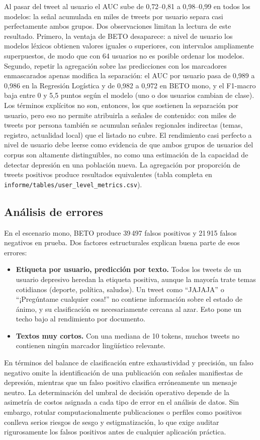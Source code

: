 \documentclass[12pt,a4paper]{article}
\begin{document}
Al pasar del tweet al usuario el AUC sube de 0{,}72--0{,}81 a 0{,}98--0{,}99 en todos los modelos: la señal acumulada en miles de tweets por usuario separa casi perfectamente ambos grupos. Dos observaciones limitan la lectura de este resultado. Primero, la ventaja de BETO desaparece: a nivel de usuario los modelos léxicos obtienen valores iguales o superiores, con intervalos ampliamente superpuestos, de modo que con 64 usuarios no es posible ordenar los modelos. Segundo, repetir la agregación sobre las predicciones con los marcadores enmascarados apenas modifica la separación: el AUC por usuario pasa de 0{,}989 a 0{,}986 en la Regresión Logística y de 0{,}982 a 0{,}972 en BETO mono, y el F1-macro baja entre 0 y 5{,}5 puntos según el modelo (uno o dos usuarios cambian de clase). Los términos explícitos no son, entonces, los que sostienen la separación por usuario, pero eso no permite atribuirla a señales de contenido: con miles de tweets por persona también se acumulan señales regionales indirectas (temas, registro, actualidad local) que el listado no cubre. El rendimiento casi perfecto a nivel de usuario debe leerse como evidencia de que ambos grupos de usuarios del corpus son altamente distinguibles, no como una estimación de la capacidad de detectar depresión en una población nueva. La agregación por proporción de tweets positivos produce resultados equivalentes (tabla completa en \texttt{informe/tables/user\_level\_metrics.csv}).

\subsection{Análisis de errores}
\label{sec:errores}
En el escenario mono, BETO produce 39\,497 falsos positivos y 21\,915 falsos negativos en prueba. Dos factores estructurales explican buena parte de esos errores:
\begin{itemize}[leftmargin=2em]
    \item \textbf{Etiqueta por usuario, predicción por texto.} Todos los tweets de un usuario depresivo heredan la etiqueta positiva, aunque la mayoría trate temas cotidianos (deporte, política, saludos). Un tweet como ``JAJAJA'' o ``¡Pregúntame cualquier cosa!'' no contiene información sobre el estado de ánimo, y su clasificación es necesariamente cercana al azar. Esto pone un techo bajo al rendimiento por documento.
    \item \textbf{Textos muy cortos.} Con una mediana de 10 tokens, muchos tweets no contienen ningún marcador lingüístico relevante.
\end{itemize}
En términos del balance de clasificación entre exhaustividad y precisión, un falso negativo omite la identificación de una publicación con señales manifiestas de depresión, mientras que un falso positivo clasifica erróneamente un mensaje neutro. La determinación del umbral de decisión operativo depende de la asimetría de costos asignada a cada tipo de error en el análisis de datos. Sin embargo, rotular computacionalmente publicaciones o perfiles como positivos conlleva serios riesgos de sesgo y estigmatización, lo que exige auditar rigurosamente los falsos positivos antes de cualquier aplicación práctica.
\end{document}
